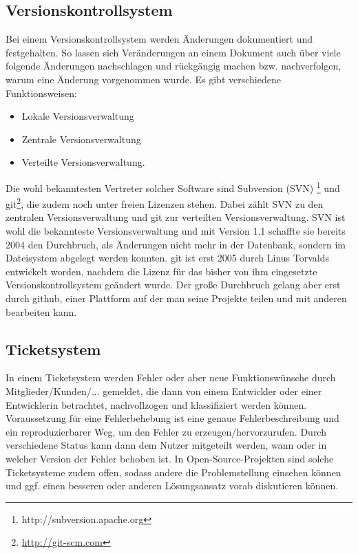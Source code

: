 \subsection{Versionskontrollsystem}
Bei einem Versionskontrollsystem werden Änderungen dokumentiert und
festgehalten. So lassen sich Veränderungen an einem Dokument auch
über viele folgende Änderungen nachschlagen und rückgängig machen bzw.
nachverfolgen, warum eine Änderung vorgenommen wurde.
Es gibt verschiedene Funktionsweisen:
\begin{itemize}
  \item Lokale Versionsverwaltung
  \item Zentrale Versionsverwaltung 
  \item Verteilte Versionsverwaltung. 
\end{itemize}
Die wohl bekanntesten Vertreter solcher Software sind Subversion (SVN)
\footnote{http://subversion.apache.org} und git\footnote{\url{http://git-scm.com}}, die
zudem noch unter freien Lizenzen stehen.
Dabei zählt SVN zu den zentralen Versionsverwaltung und git zur 
verteilten Versionsverwaltung.
SVN ist wohl die bekannteste Versionsverwaltung und mit Version 1.1 schaffte
sie bereits 2004 den Durchbruch, als Änderungen nicht mehr in der Datenbank, 
sondern im Dateisystem abgelegt werden konnten.
git ist erst 2005 durch Linus Torvalds entwickelt worden, nachdem die
Lizenz für das bisher von ihm eingesetzte Versionskontrollsystem geändert 
wurde. Der große Durchbruch gelang aber erst durch github, einer Plattform
auf der man seine Projekte teilen und mit anderen bearbeiten kann.

\subsection{Ticketsystem}
In einem Ticketsystem werden Fehler oder aber neue Funktionswünsche 
durch Mitglieder/Kunden/... gemeldet, die dann von einem Entwickler 
oder einer Entwicklerin betrachtet, nachvollzogen und klassifiziert
werden können. 
Voraussetzung für eine Fehlerbehebung ist eine genaue Fehlerbeschreibung 
und ein reproduzierbarer Weg, um den Fehler zu erzeugen/hervorzurufen.
Durch verschiedene Status kann dann dem Nutzer mitgeteilt werden, wann 
oder in welcher Version der Fehler behoben ist.
In Open-Source-Projekten sind solche Ticketsysteme zudem offen, sodass 
andere die Problemstellung einsehen können und ggf. einen besseren
oder anderen Lösungsansatz vorab diskutieren können.

\newpage
